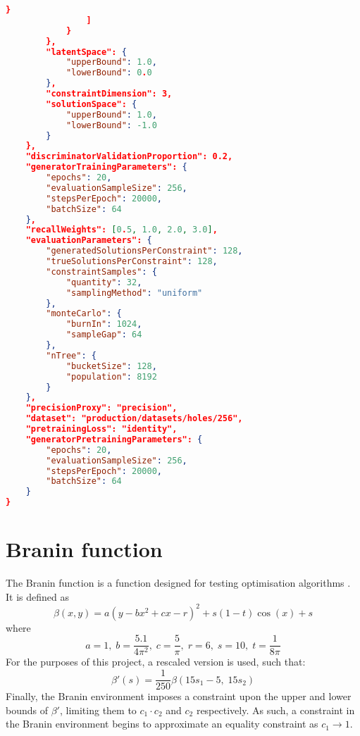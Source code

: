 \documentclass[../main.tex]{subfiles}
\begin{document}
\begin{lstlisting}[language=json,firstnumber=1,caption={Experimental parameters for training a generator on the holes environment.},captionpos=b]
                    }
                ]
            }
        },
        "latentSpace": {  
            "upperBound": 1.0,
            "lowerBound": 0.0
        },
        "constraintDimension": 3,
        "solutionSpace": {  
            "upperBound": 1.0,
            "lowerBound": -1.0
        }
    },
    "discriminatorValidationProportion": 0.2,
    "generatorTrainingParameters": {  
        "epochs": 20,
        "evaluationSampleSize": 256,
        "stepsPerEpoch": 20000,
        "batchSize": 64
    },
    "recallWeights": [0.5, 1.0, 2.0, 3.0],
    "evaluationParameters": {  
        "generatedSolutionsPerConstraint": 128,
        "trueSolutionsPerConstraint": 128,
        "constraintSamples": {  
            "quantity": 32,
            "samplingMethod": "uniform"
        },
        "monteCarlo": {  
            "burnIn": 1024,
            "sampleGap": 64
        },
        "nTree": {  
            "bucketSize": 128,
            "population": 8192
        }
    },
    "precisionProxy": "precision",
    "dataset": "production/datasets/holes/256",
    "pretrainingLoss": "identity",
    "generatorPretrainingParameters": {  
        "epochs": 20,
        "evaluationSampleSize": 256,
        "stepsPerEpoch": 20000,
        "batchSize": 64
    }
}
\end{lstlisting}

\section{Branin function} \label{appendix:braninFunction}

The Branin function is a function designed for testing optimisation algorithms \cite{bingham17}.
It is defined as
\begin{equation}
    \beta(x,y)=a(y-bx^2+cx-r)^2+s(1-t)\cos(x)+s
\end{equation}
where
\begin{equation}
    a=1,\;b=\frac{5.1}{4\pi^2},\;c=\frac{5}{\pi},\;r=6,\;s=10,\;t=\frac{1}{8\pi}
\end{equation}
For the purposes of this project, a rescaled version is used, such that:
\begin{equation}
    \beta'(s)=\frac{1}{250}\beta(15s_1-5,\;15s_2)
\end{equation}
Finally, the Branin environment imposes a constraint upon the upper and lower bounds of $\beta'$, limiting them to $c_1\cdot c_2$ and $c_2$ respectively.
As such, a constraint in the Branin environment begins to approximate an equality constraint as $c_1\to1$.
\end{document}
